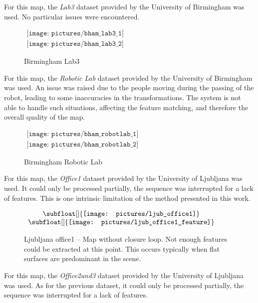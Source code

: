 For this map, the \emph{Lab3} dataset provided by the University of Birmingham was used. No particular issues were encountered.

\begin{figure}[H]
\centering$
 \begin{array}{c}
 \texttt{[image: pictures/bham\_lab3\_1]} \\
 \texttt{[image: pictures/bham\_lab3\_2]}
 \end{array}$
\caption{Birmingham Lab3}
\end{figure}

\clearpage
For this map, the \emph{Robotic Lab} dataset provided by the University of Birmingham was used. An issue was raised due to the people moving during the passing of the robot, leading to some inaccuracies in the transformations. The system is not able to handle such situations, affecting the feature matching, and therefore the overall quality of the map.

\begin{figure}[H]
\centering$
\begin{array}{c}
\texttt{[image: pictures/bham\_robotlab\_1]} \\
\texttt{[image: pictures/bham\_robotlab\_2]}
\end{array}$
\caption{Birmingham Robotic Lab}
\end{figure}

\clearpage
For this map, the \emph{Office1} dataset provided by the University of Ljubljana was used. It could only be processed partially, the sequence was interrupted for a lack of features. This is one intrinsic limitation of the method presented in this work.

\begin{figure}[H]
\centering$
 \begin{array}{c}
 \subfloat[]{\label{fig:ljub1_1} \texttt{[image: pictures/ljub\_office1]}} \\
 \subfloat[]{\label{fig:ljub1_2} \texttt{[image: pictures/ljub\_office1\_feature]}}
 \end{array}$
\caption{Ljubljana office1 -- \protect{} Map without closure loop. \protect{} Not enough features could be extracted at this point. This occurs typically when flat surfaces are predominant in the scene. }
\end{figure}

\clearpage
For this map, the \emph{Office2and3} dataset provided by the University of Ljubljana was used. As for the previous dataset, it could only be processed partially, the sequence was interrupted for a lack of features.

